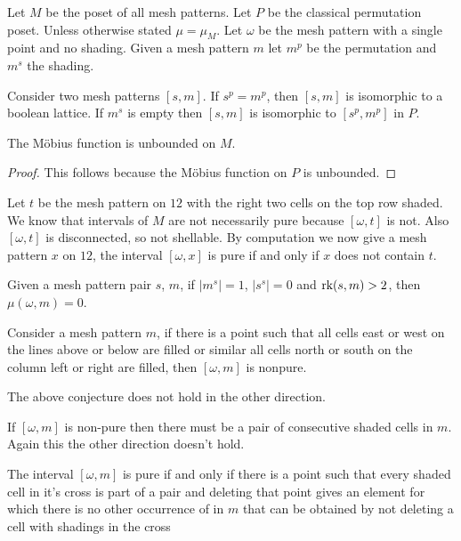 \documentclass[11pt,a4paper,oneside]{article}
\begin{document}
Let $M$ be the poset of all mesh patterns. Let $P$ be the classical permutation poset. Unless otherwise stated $\mu=\mu_M$. Let $\omega$ be the mesh pattern with a single point and no shading. Given a mesh pattern $m$ let $m^p$ be the permutation and $m^s$ the shading.

\begin{lem}
Consider two mesh patterns $[s,m]$. If $s^p=m^p$, then $[s,m]$ is isomorphic to a boolean lattice. If $m^s$ is empty then $[s,m]$ is isomorphic to $[s^p,m^p]$ in $P$.  
\end{lem}
	
\begin{cor}
The M\"obius function is unbounded on $M$.
\begin{proof}
This follows because the M\"obius function on $P$ is unbounded.
\end{proof}
\end{cor}

Let $t$ be the mesh pattern on $12$ with the right two cells on the top row shaded. We know that intervals of $M$ are not necessarily pure because $[\omega,t]$ is not. Also $[\omega,t]$ is disconnected, so not shellable. By computation we now give a mesh pattern $x$ on $12$, the interval $[\omega,x]$ is pure if and only if $x$ does not contain $t$.

\begin{conj}
Given a mesh pattern pair $s$, $m$, if $|m^s|=1$, $|s^s|=0$ and $\operatorname{\textrm{rk}}(s,m)>2$, then $\mu(\omega,m)=0$.
\end{conj}

\begin{conj}
Consider a mesh pattern $m$, if there is a point such that all cells east or west on the lines above or below are filled or similar all cells north or south on the column left or right are filled, then $[\omega,m]$ is nonpure.
\end{conj}
The above conjecture does not hold in the other direction.


If $[\omega,m]$ is non-pure then there must be a pair of consecutive shaded cells in $m$. Again this the other direction doesn't hold.

\begin{conj}
The interval $[\omega,m]$ is pure if and only if there is a point such that every shaded cell in it's cross is part of a pair and deleting that point gives an element for which there is no other occurrence of in $m$ that can be obtained by not deleting a cell with shadings in the cross
\end{conj}
\end{document}

